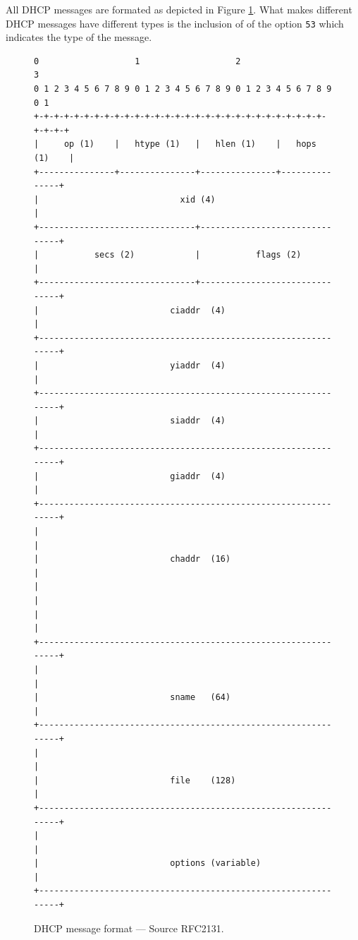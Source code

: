 \documentclass[pdftex,12pt,a4paper]{article}
\begin{document}
            All DHCP messages are formated as depicted in Figure
            \ref{fig:dhcp}. What makes different DHCP messages have different
            types is the inclusion of of the option \texttt{53} which indicates
            the type of the message.
        

            \begin{figure}[!htb]
                \centering
            \begin{verbatim}0                   1                   2                   3
0 1 2 3 4 5 6 7 8 9 0 1 2 3 4 5 6 7 8 9 0 1 2 3 4 5 6 7 8 9 0 1
+-+-+-+-+-+-+-+-+-+-+-+-+-+-+-+-+-+-+-+-+-+-+-+-+-+-+-+-+-+-+-+-+
|     op (1)    |   htype (1)   |   hlen (1)    |   hops (1)    |
+---------------+---------------+---------------+---------------+
|                            xid (4)                            |
+-------------------------------+-------------------------------+
|           secs (2)            |           flags (2)           |
+-------------------------------+-------------------------------+
|                          ciaddr  (4)                          |
+---------------------------------------------------------------+
|                          yiaddr  (4)                          |
+---------------------------------------------------------------+
|                          siaddr  (4)                          |
+---------------------------------------------------------------+
|                          giaddr  (4)                          |
+---------------------------------------------------------------+
|                                                               |
|                          chaddr  (16)                         |
|                                                               |
|                                                               |
+---------------------------------------------------------------+
|                                                               |
|                          sname   (64)                         |
+---------------------------------------------------------------+
|                                                               |
|                          file    (128)                        |
+---------------------------------------------------------------+
|                                                               |
|                          options (variable)                   |
+---------------------------------------------------------------+\end{verbatim}
                \caption{DHCP message format --- Source RFC2131.}
                \label{fig:dhcp}
            \end{figure}
\end{document}
